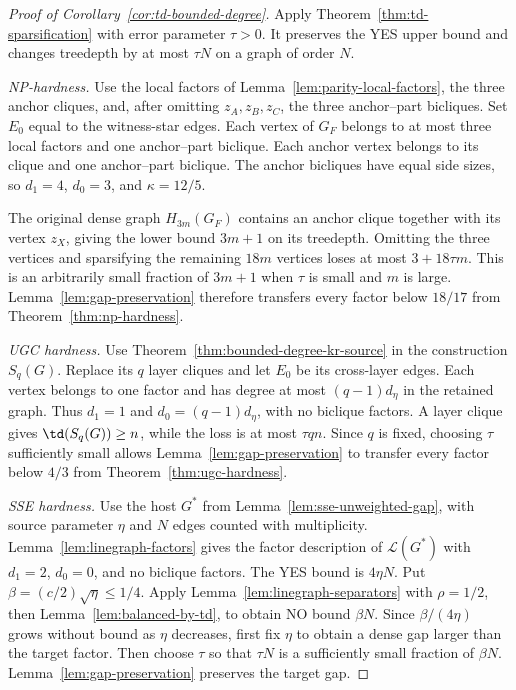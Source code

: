 \begin{proof}[Proof of Corollary~\ref{cor:td-bounded-degree}]
Apply Theorem~\ref{thm:td-sparsification} with error parameter
$\tau>0$. It preserves the YES upper bound and changes treedepth
by at most $\tau N$ on a graph of order $N$.

\emph{NP-hardness.}
Use the local factors of Lemma~\ref{lem:parity-local-factors},
the three anchor cliques, and, after omitting $z_A,z_B,z_C$, the
three anchor--part bicliques. Set $E_0$ equal to the witness-star
edges. Each vertex of $G_F$ belongs to at most three local factors
and one anchor--part biclique. Each anchor vertex belongs to its
clique and one anchor--part biclique. The anchor bicliques have
equal side sizes, so $d_1=4$, $d_0=3$, and $\kappa=12/5$.

The original dense graph $H_{3m}(G_F)$ contains an anchor clique
together with its vertex $z_X$, giving the lower bound $3m+1$
on its treedepth. Omitting the three vertices and sparsifying the
remaining $18m$ vertices loses at most $3+18\tau m$. This is an
arbitrarily small fraction of $3m+1$ when $\tau$ is small and $m$
is large. Lemma~\ref{lem:gap-preservation} therefore transfers
every factor below $18/17$ from Theorem~\ref{thm:np-hardness}.

\emph{UGC hardness.}
Use Theorem~\ref{thm:bounded-degree-kr-source} in the construction
$S_q(G)$. Replace its $q$ layer cliques and let $E_0$ be its
cross-layer edges. Each vertex belongs to one factor and has degree
at most $(q-1)d_\eta$ in the retained graph. Thus $d_1=1$ and
$d_0=(q-1)d_\eta$, with no biclique factors.
A layer clique gives $\td(S_q(G))\ge n$, while the loss is at most
$\tau qn$. Since $q$ is fixed, choosing $\tau$ sufficiently small
allows Lemma~\ref{lem:gap-preservation} to transfer every factor
below $4/3$ from Theorem~\ref{thm:ugc-hardness}.

\emph{SSE hardness.}
Use the host $G^*$ from Lemma~\ref{lem:sse-unweighted-gap}, with
source parameter $\eta$ and $N$ edges counted with multiplicity.
Lemma~\ref{lem:linegraph-factors} gives the factor description of
$\mathcal L(G^*)$ with $d_1=2$, $d_0=0$, and no biclique factors.
The YES bound is $4\eta N$. Put $\beta=(c/2)\sqrt\eta\le1/4$.
Apply Lemma~\ref{lem:linegraph-separators} with $\rho=1/2$, then
Lemma~\ref{lem:balanced-by-td}, to obtain NO bound $\beta N$.
Since $\beta/(4\eta)$ grows without
bound as $\eta$ decreases, first fix $\eta$ to obtain a dense gap
larger than the target factor. Then choose $\tau$ so that
$\tau N$ is a sufficiently small fraction of $\beta N$.
Lemma~\ref{lem:gap-preservation} preserves the target gap.
\end{proof}

